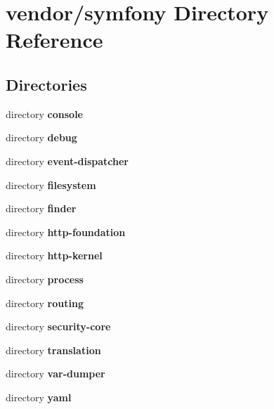 \section{vendor/symfony Directory Reference}
\label{dir_b3e721512a9288af2b52a9cbbe7d8394}
\subsection*{Directories}
\begin{DoxyCompactItemize}
\item 
directory {\bf console}
\item 
directory {\bf debug}
\item 
directory {\bf event-\/dispatcher}
\item 
directory {\bf filesystem}
\item 
directory {\bf finder}
\item 
directory {\bf http-\/foundation}
\item 
directory {\bf http-\/kernel}
\item 
directory {\bf process}
\item 
directory {\bf routing}
\item 
directory {\bf security-\/core}
\item 
directory {\bf translation}
\item 
directory {\bf var-\/dumper}
\item 
directory {\bf yaml}
\end{DoxyCompactItemize}
